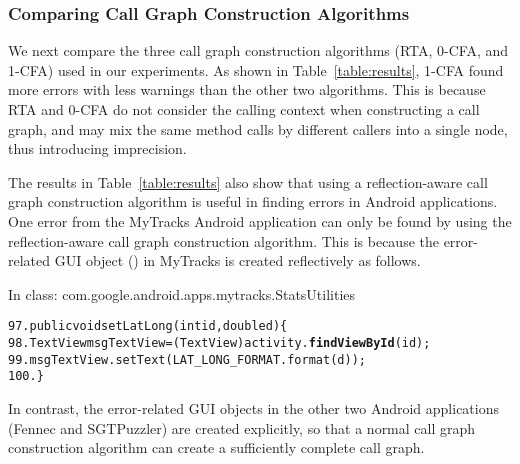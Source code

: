 \subsubsection{Comparing Call Graph Construction Algorithms}
\label{sec:reflectionaware}

We next compare the three call graph construction algorithms (RTA, 0-CFA, and 1-CFA)
used in our experiments. As shown in Table~\ref{table:results},  1-CFA found
more errors with less warnings than the other two algorithms. This
is because RTA and 0-CFA do not consider the calling context when
constructing a call graph, and may
mix the same method calls by different callers into a single node, thus
introducing imprecision. 


The results in Table~\ref{table:results} also show that using a reflection-aware
call graph construction algorithm is useful in finding errors in Android
applications. One error from the MyTracks Android application
can only be found by using the reflection-aware call graph construction algorithm.
This is because the error-related GUI object () in MyTracks is created
reflectively as follows.

\vspace{2mm}
\hspace{3mm}\small{In class: com.google.android.apps.mytracks.StatsUtilities}
\vspace{-2mm}
\begin{CodeOut}
\begin{alltt}
97.  public void setLatLong(int id, double d) \{
98.     TextView msgTextView = (TextView) activity.\textbf{findViewById}(id);
99.     msgTextView.setText(LAT\_LONG\_FORMAT.format(d));
100. \}
\end{alltt}
\end{CodeOut}

\normalsize
 
In contrast, the error-related GUI objects in the other two Android applications (Fennec
and SGTPuzzler) are created explicitly, so that a normal call graph construction
algorithm can create a sufficiently complete call graph.


